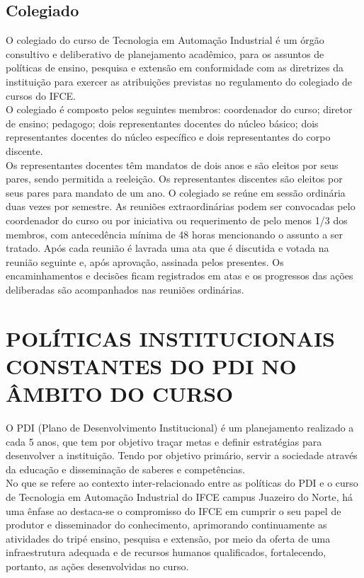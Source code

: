 \section{Colegiado}
O colegiado do curso de Tecnologia em Automação Industrial é um órgão consultivo e deliberativo de planejamento acadêmico, para os assuntos de políticas de ensino, pesquisa e extensão em conformidade com as diretrizes da instituição para exercer as atribuições previstas no regulamento do colegiado de cursos do IFCE.\\

O colegiado é composto pelos seguintes membros: coordenador do curso; diretor de ensino; pedagogo; dois representantes docentes do núcleo básico; dois representantes docentes do núcleo específico e dois representantes do corpo discente.\\

Os representantes docentes têm mandatos de dois anos e são eleitos por seus pares, sendo permitida a reeleição. Os representantes discentes são eleitos por seus pares para mandato de um ano. O colegiado se reúne em sessão ordinária duas vezes por semestre. As reuniões extraordinárias podem ser convocadas pelo coordenador do curso ou por iniciativa ou requerimento de pelo menos 1/3 dos membros, com antecedência mínima de 48 horas mencionando o assunto a ser tratado. Após cada reunião é lavrada uma ata que é discutida e votada na reunião seguinte e, após aprovação, assinada pelos presentes. Os encaminhamentos e decisões ficam registrados em atas e os progressos das ações deliberadas são acompanhados nas reuniões ordinárias.\\

\chapter{POLÍTICAS INSTITUCIONAIS CONSTANTES DO PDI NO ÂMBITO DO CURSO}

O PDI (Plano de Desenvolvimento Institucional) é um planejamento realizado a cada 5 anos, que tem por objetivo traçar metas e definir estratégias para desenvolver a instituição. Tendo por objetivo primário, servir a sociedade através da educação e disseminação de saberes e competências.\\ 

No que se refere ao contexto inter-relacionado entre as políticas do PDI e o
curso de Tecnologia em Automação Industrial do IFCE campus Juazeiro do Norte, há uma ênfase ao destaca-se o compromisso do IFCE em cumprir o seu papel de produtor e disseminador do conhecimento, aprimorando continuamente as atividades do tripé ensino, pesquisa e extensão, por meio da oferta de uma infraestrutura adequada e de recursos humanos qualificados, fortalecendo, portanto, as ações desenvolvidas 
no curso.\\

